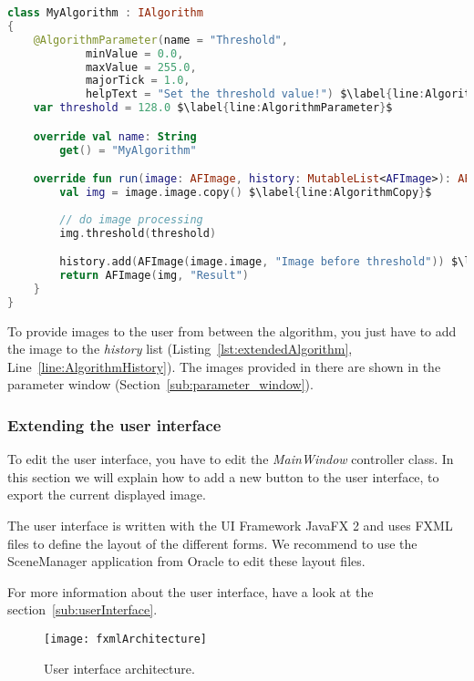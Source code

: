 \begin{lstlisting}[caption={Extended version of an algorithm.}, label={lst:extendedAlgorithm}, language=Kotlin, escapechar=$]
class MyAlgorithm : IAlgorithm
{
    @AlgorithmParameter(name = "Threshold",
            minValue = 0.0,
            maxValue = 255.0,
            majorTick = 1.0,
            helpText = "Set the threshold value!") $\label{line:AlgorithmHelpText}$
    var threshold = 128.0 $\label{line:AlgorithmParameter}$

    override val name: String
        get() = "MyAlgorithm"

    override fun run(image: AFImage, history: MutableList<AFImage>): AFImage {
        val img = image.image.copy() $\label{line:AlgorithmCopy}$
        
        // do image processing
        img.threshold(threshold)

        history.add(AFImage(image.image, "Image before threshold")) $\label{line:AlgorithmHistory}$
        return AFImage(img, "Result")
    }
}
\end{lstlisting}

To provide images to the user from between the algorithm, you just have to add the image to the \textit{history} list (Listing~\ref{lst:extendedAlgorithm}, Line~\ref{line:AlgorithmHistory}). The images provided in there are shown in the parameter window (Section~\ref{sub:parameter_window}).

\subsubsection{Extending the user interface}

To edit the user interface, you have to edit the \textit{MainWindow} controller class. In this section we will explain how to add a new button to the user interface, to export the current displayed image.

The user interface is written with the UI Framework JavaFX 2 and uses FXML files to define the layout of the different forms. We recommend to use the SceneManager application from Oracle to edit these layout files.

For more information about the user interface, have a look at the section~\ref{sub:userInterface}.

\begin{figure}[H]
	\centering
	\texttt{[image: fxmlArchitecture]}
	\caption{User interface architecture.}
	\label{fig:fxmlArchitecture}
\end{figure}

